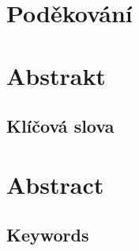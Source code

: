 \openright
\vspace*{\fill}
\section*{Poděkování}
\noindent
\Podekovani
\vspace{1cm}


\openright
\section*{Abstrakt}
\noindent
\Abstrakt
\subsection*{Klíčová slova}
\noindent
\KlicovaSlova

\vfill

\section*{Abstract}
\noindent
\AbstraktEN
\subsection*{Keywords}
\noindent
\KlicovaSlovaEN

\openright
{}